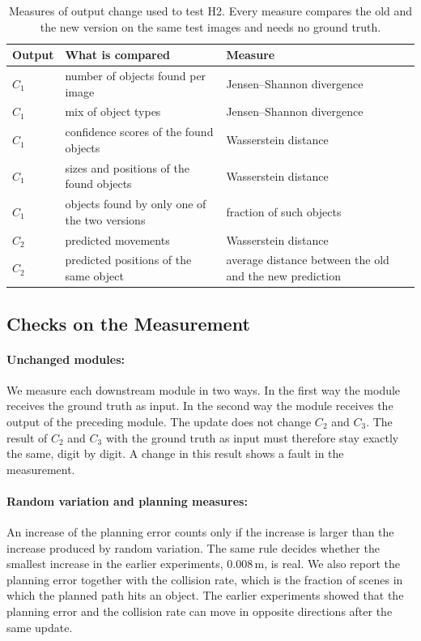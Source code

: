 \documentclass[11pt,a4paper]{article}
\begin{document}
\begin{table}[h!]
\centering
\caption{Measures of output change used to test H2. Every measure compares
the old and the new version on the same test images and needs no ground
truth.}
\label{tab:measures}
\small
\renewcommand{\arraystretch}{1.3}
\begin{tabular}{@{}lL{6.4cm}L{5.4cm}@{}}
\toprule
\textbf{Output} & \textbf{What is compared} & \textbf{Measure} \\
\midrule
$C_1$ & number of objects found per image & Jensen--Shannon divergence \\
$C_1$ & mix of object types & Jensen--Shannon divergence \\
$C_1$ & confidence scores of the found objects & Wasserstein distance \\
$C_1$ & sizes and positions of the found objects & Wasserstein distance \\
$C_1$ & objects found by only one of the two versions & fraction of such objects \\
\midrule
$C_2$ & predicted movements & Wasserstein distance \\
$C_2$ & predicted positions of the same object & average distance between the old and the new prediction \\
\bottomrule
\end{tabular}
\end{table}

\subsection{Checks on the Measurement}
\label{sec:checks}

\paragraph{Unchanged modules:} We measure each downstream module in two
ways. In the first way the module receives the ground truth as input. In
the second way the module receives the output of the preceding module.
The update does not change $C_2$ and $C_3$. The result of $C_2$ and $C_3$
with the ground truth as input must therefore stay exactly the same, digit
by digit. A change in this result shows a fault in the measurement.

\paragraph{Random variation and planning measures:} An increase of the
planning error counts only if the increase is larger than the increase
produced by random variation. The same rule decides whether the smallest
increase in the earlier experiments, $0.008$\,m, is real. We also report
the planning error together with the collision rate, which is the fraction
of scenes in which the planned path hits an object. The earlier
experiments showed that the planning error and the collision rate can move
in opposite directions after the same update.
\end{document}
